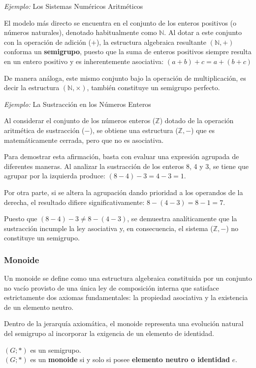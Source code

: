\documentclass{article}
\begin{document}
\noindent \textit{Ejemplo:} Los Sistemas Numéricos Aritméticos

El modelo más directo se encuentra en el conjunto de los enteros positivos (o números naturales), denotado habitualmente como $\mathbb{N}$. Al dotar a este conjunto con la operación de adición ($+$), la estructura algebraica resultante $(\mathbb{N}, +)$ conforma un \textbf{semigrupo}, puesto que la suma de enteros positivos siempre resulta en un entero positivo y es inherentemente asociativa: $(a + b) + c = a + (b + c)$

De manera análoga, este mismo conjunto bajo la operación de multiplicación, es decir la estructura $(\mathbb{N}, \times)$, también constituye un semigrupo perfecto.
\bigskip

\noindent \textit{Ejemplo:} La Sustracción en los Números Enteros

Al considerar el conjunto de los números enteros ($\mathbb{Z}$) dotado de la operación aritmética de sustracción ($-$), se obtiene una estructura ($\mathbb{Z}, -$) que es matemáticamente cerrada, pero que no es asociativa.

Para demostrar esta afirmación, basta con evaluar una expresión agrupada de diferentes maneras. Al analizar la sustracción de los enteros 8, 4 y 3, se tiene que agrupar por la izquierda produce: $(8 - 4) - 3 = 4 - 3 = 1$.

Por otra parte, si se altera la agrupación dando prioridad a los operandos de la derecha, el resultado difiere significativamente: $8 - (4 - 3) = 8 - 1 = 7$.

Puesto que $(8 - 4) - 3 \neq 8 - (4 - 3)$, se demuestra analíticamente que la sustracción incumple la ley asociativa y, en consecuencia, el sistema ($\mathbb{Z}, -$) no constituye un semigrupo.

\subsubsection{Monoide}
\label{sec:monoide}     

Un monoide se define como una estructura algebraica constituida por un conjunto no vacío provisto de una única ley de composición interna que satisface estrictamente dos axiomas fundamentales: la propiedad asociativa y la existencia de un elemento neutro.

Dentro de la jerarquía axiomática, el monoide representa una evolución natural del semigrupo al incorporar la exigencia de un elemento de identidad.

\begin{center}
$(G; \ast)$ es un semigrupo.\\
$(G; \ast)$ es un \textbf{monoide} si y solo si posee \textbf{elemento neutro o identidad} $e$.
\end{center}
\bigskip
\end{document}

